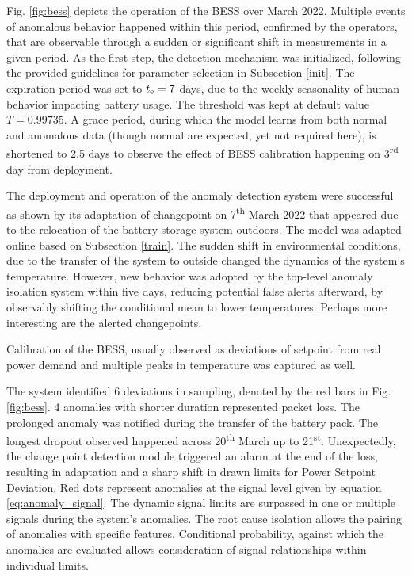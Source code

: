 Fig. \ref{fig:bess} depicts the operation of the BESS over March 2022. Multiple events of anomalous behavior happened within this period, confirmed by the operators, that are observable through a sudden or significant shift in measurements in a given period. As the first step, the detection mechanism was initialized, following the provided guidelines for parameter selection in Subsection \ref{init}. The expiration period was set to $t _{\text{e}} = 7$ days, due to the weekly seasonality of human behavior impacting battery usage. The threshold was kept at default value $T = 0.99735$. A grace period, during which the model learns from both normal and anomalous data (though normal are expected, yet not required here), is shortened to 2.5 days to observe the effect of BESS calibration happening on 3\textsuperscript{rd} day from deployment.

The deployment and operation of the anomaly detection system were successful as shown by its adaptation of changepoint on 7\textsuperscript{th} March 2022 that appeared due to the relocation of the battery storage system outdoors. The model was adapted online based on Subsection \ref{train}. The sudden shift in environmental conditions, due to the transfer of the system to outside changed the dynamics of the system's temperature. However, new behavior was adopted by the top-level anomaly isolation system within five days, reducing potential false alerts afterward, by observably shifting the conditional mean to lower temperatures. Perhaps more interesting are the alerted changepoints.

Calibration of the BESS, usually observed as deviations of setpoint from real power demand and multiple peaks in temperature was captured as well.

The system identified 6 deviations in sampling, denoted by the red bars in Fig. \ref{fig:bess}. 4 anomalies with shorter duration represented packet loss. The prolonged anomaly was notified during the transfer of the battery pack. The longest dropout observed happened across 20\textsuperscript{th} March up to 21\textsuperscript{st}. Unexpectedly, the change point detection module triggered an alarm at the end of the loss, resulting in adaptation and a sharp shift in drawn limits for Power Setpoint Deviation. Red dots represent anomalies at the signal level given by equation \eqref{eq:anomaly_signal}. The dynamic signal limits are surpassed in one or multiple signals during the system's anomalies. The root cause isolation allows the pairing of anomalies with specific features. Conditional probability, against which the anomalies are evaluated allows consideration of signal relationships within individual limits.

